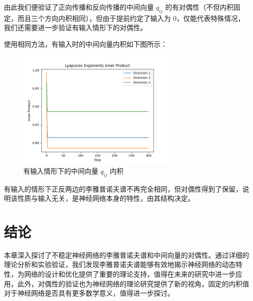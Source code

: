 由此我们便验证了正向传播和反向传播的中间向量 $q_{ij}$ 的有对偶性（不但内积固定，而且三个方向内积相同），但由于提前约定了输入为 0，仅能代表特殊情况，我们还需要进一步验证有输入情形下的对偶性。

使用相同方法，有输入时的中间向量内积如下图所示：

\begin{figure}[htbp]
  \centering
  \includegraphics[width=0.7\textwidth]{figures/lyapunov_exponents_inner_product_with_input.png}
  \caption{有输入情形下的中间向量 $q_{ij}$ 内积}
  \label{fig:inner_product_with_input}
\end{figure}

有输入的情形下正反两边的李雅普诺夫谱不再完全相同，但对偶性得到了保留，说明该性质与输入无关，是神经网络本身的特性，由其结构决定。

\section{结论}

本章深入探讨了不稳定神经网络的李雅普诺夫谱和中间向量的对偶性。通过详细的理论分析和实验验证，我们发现李雅普诺夫谱能够有效地揭示神经网络的动态特性，为网络的设计和优化提供了重要的理论支持，值得在未来的研究中进一步应用，此外，对偶性的验证也为神经网络的理论研究提供了新的视角，固定的内积值对于神经网络是否具有更多数学意义，值得进一步探讨。